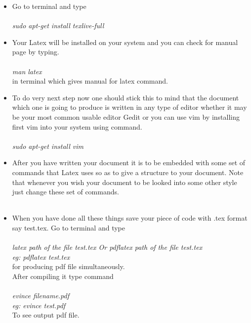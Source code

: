 \begin{itemize}
\item Go to terminal and type\\\\
\textit{sudo apt-get install texlive-full}
\item Your Latex will be installed on your system and you can check for manual page by typing.\\\\
\textit{man latex}\\
in terminal which gives manual for latex command.\\
\item To do very next step now one should stick this to mind that the document which one is going to produce is written in any type of editor whether it may be your most common usable editor Gedit or you can use vim by installing first vim into your system using command.\\\\
\textit{sudo apt-get install vim}\\
\item After you have written your document it is to be embedded with some set of commands that Latex uses so as to give a structure to your document. Note that whenever you wish your document to be looked into some other style just change these set of commands.\\\\
\item When you have done all these things save your piece of code with .tex format say test.tex. Go to terminal and type\\\\
\textit{latex path of the file test.tex Or pdflatex path of the file test.tex\\ eg: pdflatex test.tex}\\
for producing pdf file simultaneously.\\
After compiling it type command\\\\
\textit{evince filename.pdf\\ eg: evince test.pdf}\\
To see output pdf file. 
\end{itemize}

